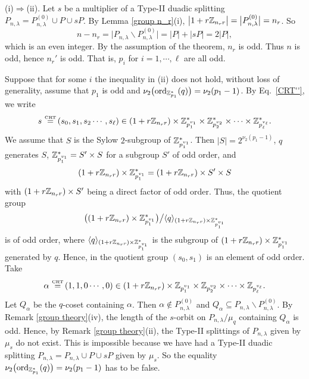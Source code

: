 \documentclass{article}
\numberwithin{equation}{section}
\numberwithin{table}{section}
\def\Z{{\Bbb Z}}
\def\CRT{\,\mathop{=}\limits^{\mbox{\rm\tiny CRT}}\,}
\begin{document}
(i)$\Rightarrow$(ii).
Let $s$ be a multiplier of a Type-II duadic splitting 
$P_{n,\lambda}=P_{n,\lambda}^{(0)}\cup P\cup sP$.
By Lemma \ref{group n_r}(i),
$\big|1+r\Z_{n_r r}\big|=\big|P_{n,\lambda}^{(0)}\big|=n_r$.
So 
$$
 n-n_r=\big|P_{n,\lambda}\backslash P_{n,\lambda}^{(0)}\big|
 =|P|+|sP|=2|P|,
$$
which is an even integer.
By the assumption of the theorem, $n_r$ is odd. Thus $n$ is odd,
hence $n_r'$ is odd. That is, $p_i$ for $i=1,\cdots,\ell$ are all odd.

Suppose that for some $i$ the inequality in (ii) does not hold, 
without loss of generality, assume that $p_1$ is odd 
and $\nu_2\big({\rm ord}_{\Z_{p_1}^*}(q)\big)=\nu_2(p_1-1)$.
By Eq.~\eqref{CRT''}, we write 
$$
s\CRT (s_0,s_1,s_2\cdots,s_\ell)\in
 (1+r\Z_{n_r r})\times\Z_{p_1^{v_1}}^*\times\Z_{p_2^{v_2}}^*
 \times\cdots\times\Z_{p_\ell^{v_\ell}}^*.
$$
We assume that $S$ is the Sylow $2$-subgroup of $\Z_{p_1^{v_1}}^*$.
Then $|S|=2^{\nu_2(p_1-1)}$,  $q$ generates $S$, 
$\Z_{p_1^{v_1}}^*=S'\times S$ for a subgroup $S'$ of odd order,
and
$$
 (1+r\Z_{n_r r})\times\Z_{p_1^{v_1}}^*
 =(1+r\Z_{n_r r})\times S'\times S
$$
with $(1+r\Z_{n_r r})\times S'$ being a direct factor of odd order.
Thus, the quotient group
\begin{equation*}
\big((1+r\Z_{n_r r})\times\Z_{p_1^{v_1}}^*\big)\big/
\langle q\rangle_{(1+r\Z_{n_r r})\times\Z_{p_1^{v_1}}^*}
\end{equation*}
is of odd order, where
$\langle q\rangle_{(1+r\Z_{n_r r})\times\Z_{p_1^{v_1}}^*}$ is the
subgroup of $(1+r\Z_{n_r r})\times\Z_{p_1^{v_1}}^*$ generated by $q$.
Hence, in the quotient group $(s_0,s_1)$ is an element of odd order.
Take
$$
\alpha\CRT (1,1,0\cdots,0)\in
 (1+r\Z_{n_r r})\times\Z_{p_1^{v_1}}\times\Z_{p_2^{v_2}}
 \times\cdots\times\Z_{p_\ell^{v_\ell}}.
$$
Let $Q_\alpha$ be the $q$-coset containing $\alpha$.
Then $\alpha\notin P_{n,\lambda}^{(0)}$ and
$Q_\alpha\subseteq P_{n,\lambda}\backslash P_{n,\lambda}^{(0)}$.
By Remark \ref{group theory}(iv), the length of the $s$-orbit
on $P_{n,\lambda}/\mu_q$ containing $Q_\alpha$ is odd.
Hence, by Remark \ref{group theory}(ii),
the Type-II splittings of $P_{n,\lambda}$ given by $\mu_s$ do not exist. 
This is impossible because we have had a 
Type-II duadic splitting $P_{n,\lambda}=P_{n,\lambda}\cup P\cup sP$
given by $\mu_s$.  So the equality
$\nu_2\big({\rm ord}_{\Z_{p_1}^*}(q)\big)=\nu_2(p_1-1)$
has to be false.
\end{document}
